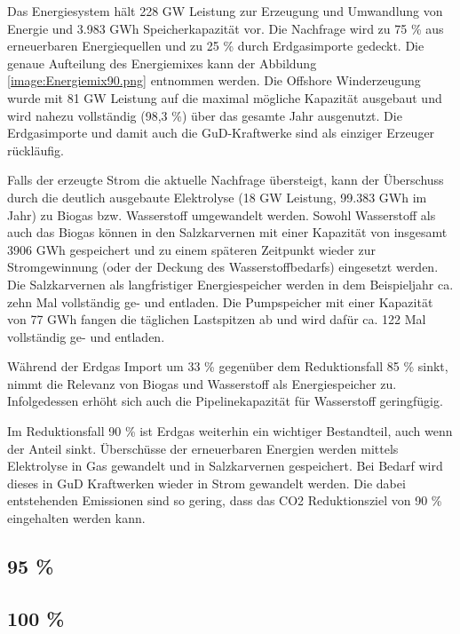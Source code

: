 Das Energiesystem hält 228 GW Leistung zur Erzeugung und Umwandlung von Energie und 3.983 GWh Speicherkapazität vor. Die Nachfrage wird zu 75 \% aus erneuerbaren Energiequellen und zu 25 \% durch Erdgasimporte gedeckt. Die genaue Aufteilung des Energiemixes kann der Abbildung \ref{image:Energiemix90.png} entnommen werden. Die Offshore Winderzeugung wurde mit 81 GW Leistung auf die maximal mögliche Kapazität ausgebaut und wird nahezu vollständig (98,3 \%) über das gesamte Jahr ausgenutzt. 
Die Erdgasimporte und damit auch die GuD-Kraftwerke sind als einziger Erzeuger rückläufig.  


Falls der erzeugte Strom die aktuelle Nachfrage übersteigt, kann der Überschuss durch die deutlich ausgebaute Elektrolyse (18 GW Leistung, 99.383 GWh im Jahr) zu Biogas bzw. Wasserstoff umgewandelt werden. Sowohl Wasserstoff als auch das Biogas können in den Salzkarvernen mit einer Kapazität von insgesamt 3906 GWh gespeichert und zu einem späteren Zeitpunkt wieder zur Stromgewinnung (oder der Deckung des Wasserstoffbedarfs) eingesetzt werden. Die Salzkarvernen als langfristiger Energiespeicher werden in dem Beispieljahr ca. zehn Mal vollständig ge- und entladen. Die Pumpspeicher mit einer Kapazität von 77 GWh fangen die täglichen Lastspitzen ab und wird dafür ca. 122 Mal vollständig ge- und entladen.

Während der Erdgas Import um 33 \% gegenüber dem Reduktionsfall 85 \% sinkt, nimmt die Relevanz von Biogas und Wasserstoff als Energiespeicher zu. Infolgedessen erhöht sich auch die Pipelinekapazität für Wasserstoff geringfügig. 

Im Reduktionsfall 90 \% ist Erdgas weiterhin ein wichtiger Bestandteil, auch wenn der Anteil sinkt. Überschüsse der erneuerbaren Energien werden mittels Elektrolyse in Gas gewandelt und in Salzkarvernen gespeichert. Bei Bedarf wird dieses in GuD Kraftwerken wieder in Strom gewandelt werden. Die dabei entstehenden Emissionen sind so gering, dass das CO2 Reduktionsziel von 90 \% eingehalten werden kann. 

\subsection{95 \%}

\subsection{100 \%}
%